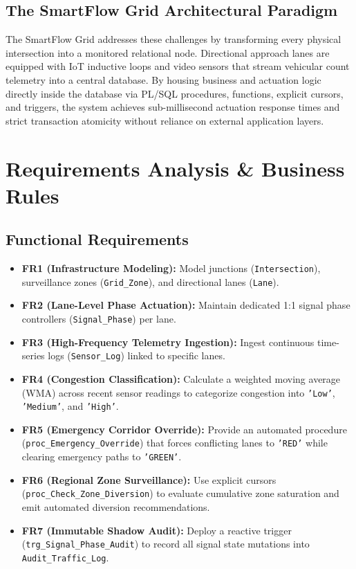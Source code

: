 \documentclass[11pt,a4paper]{report}
\begin{document}
\section{The SmartFlow Grid Architectural Paradigm}
The SmartFlow Grid addresses these challenges by transforming every physical intersection into a monitored relational node. Directional approach lanes are equipped with IoT inductive loops and video sensors that stream vehicular count telemetry into a central database. By housing business and actuation logic directly inside the database via PL/SQL procedures, functions, explicit cursors, and triggers, the system achieves sub-millisecond actuation response times and strict transaction atomicity without reliance on external application layers.

\chapter{Requirements Analysis \& Business Rules}

\section{Functional Requirements}
\begin{itemize}
    \item \textbf{FR1 (Infrastructure Modeling):} Model junctions (\texttt{Intersection}), surveillance zones (\texttt{Grid\_Zone}), and directional lanes (\texttt{Lane}).
    \item \textbf{FR2 (Lane-Level Phase Actuation):} Maintain dedicated 1:1 signal phase controllers (\texttt{Signal\_Phase}) per lane.
    \item \textbf{FR3 (High-Frequency Telemetry Ingestion):} Ingest continuous time-series logs (\texttt{Sensor\_Log}) linked to specific lanes.
    \item \textbf{FR4 (Congestion Classification):} Calculate a weighted moving average (WMA) across recent sensor readings to categorize congestion into \texttt{'Low'}, \texttt{'Medium'}, and \texttt{'High'}.
    \item \textbf{FR5 (Emergency Corridor Override):} Provide an automated procedure (\texttt{proc\_Emergency\_Override}) that forces conflicting lanes to \texttt{'RED'} while clearing emergency paths to \texttt{'GREEN'}.
    \item \textbf{FR6 (Regional Zone Surveillance):} Use explicit cursors (\texttt{proc\_Check\_Zone\_Diversion}) to evaluate cumulative zone saturation and emit automated diversion recommendations.
    \item \textbf{FR7 (Immutable Shadow Audit):} Deploy a reactive trigger (\texttt{trg\_Signal\_Phase\_Audit}) to record all signal state mutations into \texttt{Audit\_Traffic\_Log}.
\end{itemize}
\end{document}

